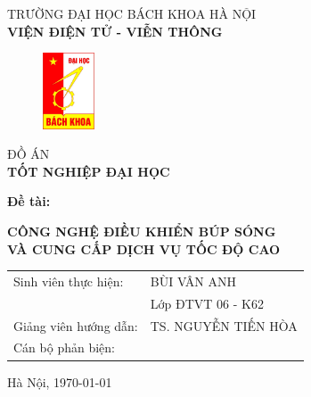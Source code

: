 \cleardoublepage
\thispagestyle{empty}
\begin{center}
\vspace{-12pt}  TRƯỜNG ĐẠI HỌC BÁCH KHOA HÀ NỘI \\
\textbf{\fontsize{16pt}{0pt}\selectfont VIỆN ĐIỆN TỬ - VIỄN THÔNG}
\vspace{0.5cm}
 \begin{figure}[H]
     \centering
     \includegraphics[width=1.53cm,height=2.26cm]{Images/logodhbk.png}
 \end{figure}
\vspace{1.5cm}
\fontsize{24pt}{0pt}\selectfont ĐỒ ÁN\\
\vspace{12pt}
\textbf{\fontsize{32pt}{0pt}\selectfont TỐT NGHIỆP ĐẠI HỌC}
\vspace{1.5cm}
\end{center}
\hspace{6pt}\textbf{\fontsize{14pt}{0pt}\selectfont Đề tài:}
\begin{center}
    \textbf{\fontsize{20pt}{0pt}\selectfont CÔNG NGHỆ ĐIỀU KHIỂN BÚP SÓNG}\\
    \textbf{\fontsize{20pt}{0pt}\selectfont VÀ CUNG CẤP DỊCH VỤ TỐC ĐỘ CAO}

\vspace{1.5cm}
\begin{table}[H]
    \centering
    \begin{tabular}{l l}
 \fontsize{14pt}{0pt}\selectfont Sinh viên thực hiện:    & \fontsize{14pt}{0pt}\selectfont BÙI VÂN ANH \vspace{6pt} \\ 
     & \fontsize{14pt}{0pt}\selectfont Lớp ĐTVT 06 - K62 \vspace{6pt}\\
\fontsize{14pt}{0pt}\selectfont Giảng viên hướng dẫn: & \fontsize{14pt}{0pt}\selectfont TS. NGUYỄN TIẾN HÒA \vspace{6pt}\\
\fontsize{14pt}{0pt}\selectfont Cán bộ phản biện: & 
\end{tabular}
\end{table}
\vspace{2.5cm}
 \fontsize{14pt}{0pt}\selectfont Hà Nội, \today
\end{center}
\cleardoublepage